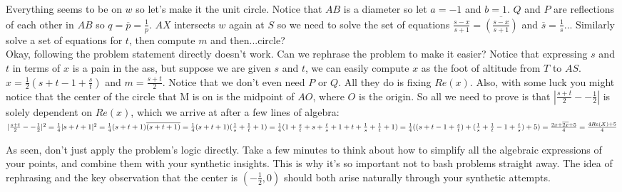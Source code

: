 \documentclass[11pt]{scrartcl}
\begin{document}
\begin{soln}
  Everything seems to be on $w$ so let's make it the unit circle. Notice that $AB$ is a diameter so let $a=-1$ and $b=1$. $Q$ and $P$ are reflections of each other in $AB$ so $q=\overline{p}=\frac{1}{p}$. $AX$ intersects $w$ again at $S$ so we need to solve the set of equations $\frac{s-x}{s+1}=\overline{(\frac{s-x}{s+1})}$ and $\overline{s}=\frac{1}{s}$... Similarly solve a set of equations for $t$, then compute $m$ and then...circle?\\
  Okay, following the problem statement directly doesn't work. Can we rephrase the problem to make it easier? Notice that expressing $s$ and $t$ in terms of $x$ is a pain in the ass, but suppose we are given $s$ and $t$, we can easily compute $x$ as the foot of altitude from $T$ to $AS$. $x=\frac{1}{2}(s+t-1+\frac{s}{t})$ and $m=\frac{s+t}{2}$. Notice that we don't even need $P$ or $Q$. All they do is fixing $Re(x)$. Also, with some luck you might notice that the center of the circle that M is on is the midpoint of $AO$, where $O$ is the origin. So all we need to prove is that $|\frac{s+t}{2}--\frac{1}{2}|$ is solely dependent on $Re(x)$, which we arrive at after a few lines of algebra:\\
  $|\frac{s+t}{2}--\frac{1}{2}|^2\\
  =\frac{1}{4}|s+t+1|^2\\
  =\frac{1}{4}(s+t+1)\overline{(s+t+1)}\\
  =\frac{1}{4}(s+t+1)(\frac{1}{s}+\frac{1}{t}+1)\\
  =\frac{1}{4}(1+\frac{s}{t}+s+\frac{t}{s}+1+t+\frac{1}{s}+\frac{1}{t}+1)\\
  =\frac{1}{4}((s+t-1+\frac{s}{t})+(\frac{1}{s}+\frac{1}{t}-1+\frac{t}{s})+5)\\
  =\frac{2x+\overline{2x}+5}{4}\\
  =\frac{4Re(X)+5}{4}\\
  $
\end{soln}
As seen, don't just apply the problem's logic directly. Take a few minutes to think about how to simplify all the algebraic expressions of your points, and combine them with your synthetic insights. This is why it's so important not to bash problems straight away. The idea of rephrasing and the key observation that the center is $(-\frac{1}{2}, 0)$ should both arise naturally through your synthetic attempts. \\
\end{document}
